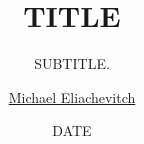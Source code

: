 \documentclass[18pt]{beamer}
\title{TITLE}
\subtitle{SUBTITLE.}
\author{\underline{Michael Eliachevitch}}
\date{DATE}
\institute{ETP - KIT}
\begin{document}
  
  \begin{frame}
  \titlepage
  \end{frame}
\end{document}
